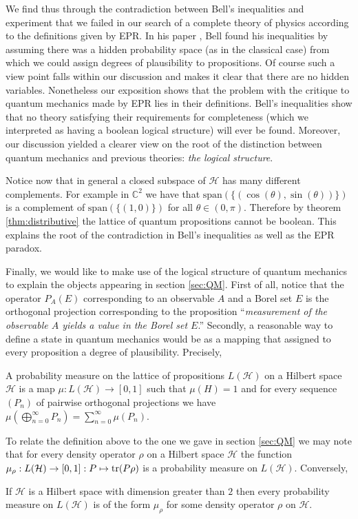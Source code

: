 We find thus through the contradiction between Bell's inequalities and experiment that we failed in our search of a complete theory of physics according to the definitions given by EPR. In his paper \cite{Bell1964}, Bell found his inequalities by assuming there was a hidden probability space (as in the classical case) from which we could assign degrees of plausibility to propositions. Of course such a view point falls within our discussion and makes it clear that there are no hidden variables. Nonetheless our exposition shows that the problem with the critique to quantum mechanics made by EPR lies in their definitions. Bell's inequalities show that no theory satisfying their requirements for completeness (which we interpreted as having a boolean logical structure) will ever be found. Moreover, our discussion yielded a clearer view on the root of the distinction between quantum mechanics and previous theories: \textit{the logical structure}.

Notice now that in general a closed subspace of $\mathcal{H}$ has many different complements. For example in $\mathbb{C}^2$ we have that $\text{span}(\{(\cos(\theta),\sin(\theta))\})$ is a complement of $\text{span}(\{(1,0)\})$ for all $\theta\in (0,\pi)$. Therefore by theorem \ref{thm:distributive} the lattice of quantum propositions cannot be boolean. This explains the root of the contradiction in Bell's inequalities as well as the EPR paradox.

Finally, we would like to make use of the logical structure of quantum mechanics to explain the objects appearing in section \ref{sec:QM}. First of all, notice that the operator $P_A(E)$ corresponding to an observable $A$ and a Borel set $E$ is the orthogonal projection corresponding to the proposition ``\textit{measurement of the observable $A$ yields a value in the Borel set $E$}.'' Secondly, a reasonable way to define a state in quantum mechanics would be as a mapping that assigned to every proposition a degree of plausibility. Precisely,

\begin{definition}
A probability measure on the lattice of propositions $L(\mathcal{H})$ on a Hilbert space $\mathcal{H}$ is a map $\mu:L(\mathcal{H})\to [0,1]$ such that $\mu(H)=1$ and for every sequence $(P_n)$ of pairwise orthogonal projections we have $\mu(\bigoplus_{n=0}^{\infty}P_n)=\sum_{n=0}^{\infty}\mu(P_n)$. 
\end{definition} 

To relate the definition above to the one we gave in section \ref{sec:QM} we may note that for every density operator $\rho$ on a Hilbert space $\mathcal{H}$ the function $\mu_\rho:L(\mathcal{H})\to [0,1]:P\mapsto \operatorname{tr}(P\rho)$ is a probability measure on $L(\mathcal{H})$. Conversely,

\begin{theorem}
If $\mathcal{H}$ is a Hilbert space with dimension greater than $2$ then every probability measure on $L(\mathcal{H})$ is of the form $\mu_\rho$ for some density operator $\rho$ on $\mathcal{H}$.
\end{theorem}